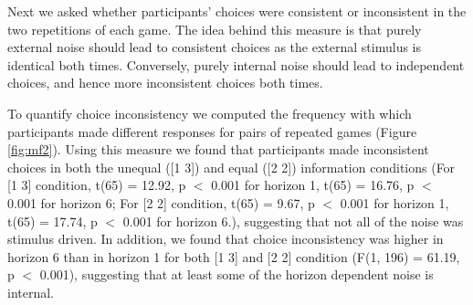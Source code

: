 \documentclass[12pt]{article}
\begin{document}
	Next we asked whether participants' choices were consistent or inconsistent in the two repetitions of each game.  The idea behind this measure is that purely external noise should lead to consistent choices as the external stimulus is identical both times. Conversely, purely internal noise should lead to independent choices, and hence more inconsistent choices both times. 
	
	To quantify choice inconsistency we computed the frequency with which participants made different responses for pairs of repeated games (Figure \ref{fig:mf2}). Using this measure we found that participants made inconsistent choices in both the unequal ([1 3]) and equal ([2 2]) information conditions (For [1 3] condition, t(65) = 12.92, p $<$ 0.001 for horizon 1, t(65) = 16.76, p $<$ 0.001 for horizon 6; For [2 2] condition, t(65) = 9.67, p $<$ 0.001 for horizon 1, t(65) = 17.74, p $<$ 0.001 for horizon 6.), suggesting that not all of the noise was stimulus driven. In addition, we found that choice inconsistency was higher in horizon 6 than in horizon 1 for both [1 3] and [2 2] condition (F(1, 196) = 61.19, p $<$ 0.001), suggesting that at least some of the horizon dependent noise is internal.
	
	
	
	
	
\end{document}
